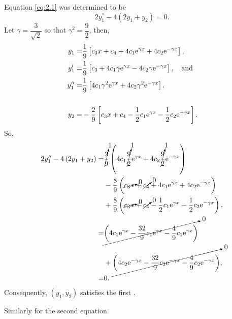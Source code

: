 \def\gm{\dfrac{3}{ \sqrt{2} } }%
\def\g2{\dfrac{9}{2}}
\def\1o9{\frac{1}{9}}%
\def\2o9{\frac{2}{9}}%
\def\4o9{\frac{4}{9}}%
\def\9o2{\frac{9}{2}}%
\def\8o9{\frac{8}{9}}%
\def\32o9{\frac{32}{9}}%
\def\egx{\e^{\gamma x}}%
\def\engx{\e^{-\gamma x}}%
Equation \eqref{eq:2.1} was determined to be
\[
	2y_1^\dprime - 4\left(2y_1+y_2\right) = 0.
\]
Let $\gamma = \gm$ so that $\gamma^2=\g2$, then,
\begin{align*}
	y_1 =& \1o9\left[c_3x + c_4 + 4c_1\e^{\gamma x} + 4c_2\e^{-\gamma x}\right],\\
	y_1^\prime =& \1o9\left[c_3  + 4c_1\gamma\e^{\gamma x} - 4c_2\gamma\e^{-\gamma x}\right],\quad\textrm{and}\\
	y_1^\dprime =&  \1o9\left[4c_1\gamma^2\e^{\gamma x} + 4c_2\gamma^2\e^{-\gamma x}\right].\\\\\
	y_2 =& -\2o9\left[c_3x + c_4-\half c_1\e^{\gamma x} -\half c_2\e^{-\gamma x} \right].
\end{align*}
So,
\begin{align*}
	2y_1^\dprime -4\left(2y_1 + y_2\right) =&\cancelto{1}{\2o9}\left(4c_1\cancelto{1}{\9o2}\e^{\gamma x} + 4c_2\cancelto{1}{\9o2}\e^{-\gamma x}\right)\\
	{}& -\8o9\left(\cancelto{0}{c_3 x} + \cancelto{0}{c_4} + 4c_1\e^{\gamma x} + 4c_2\e^{-\gamma x}\right)\\
	{}& +\8o9\left(\cancelto{0}{c_3 x} + \cancelto{0}{c_4} - \half c_1\e^{\gamma x} - \half c_2\e^{-\gamma x}\right),\\
	=& \cancelto{0}{\left(4c_1\e^{\gamma x} - \32o9c_1\e^{\gamma x}-\4o9c_1\e^{\gamma x}\right)}\\
	{}&  + \cancelto{0}{ \left( 4 c_2 \e^{-\gamma x} - \32o9 c_2 \e^{-\gamma x} - \4o9 c_2 \e^{-\gamma x}\right)},\\
	=& 0.
\end{align*}
Consequently, $\left(y_1,y_2\right)$ satisfies the first \el.

Similarly for the second \el equation.

